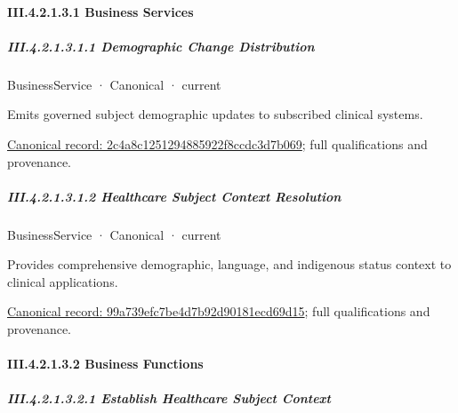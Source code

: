 \paragraph*{III.4.2.1.3.1 Business Services}
\label{navigation:III.4.2.1.3.1}

\subparagraph*{III.4.2.1.3.1.1 Demographic Change Distribution}
\label{navigation:III.4.2.1.3.1.1}

\label{element:2c4a8c1251294885922f8ccdc3d7b069}
{\small BusinessService · Canonical · current}\par

Emits governed subject demographic updates to subscribed clinical systems.


{\footnotesize \href{../../../../continuum/business/business-service/2c4a8c1251294885922f8ccdc3d7b069.md}{Canonical record: 2c4a8c1251294885922f8ccdc3d7b069}; full qualifications and provenance.}\par
\subparagraph*{III.4.2.1.3.1.2 Healthcare Subject Context Resolution}
\label{navigation:III.4.2.1.3.1.2}

\label{element:99a739efc7be4d7b92d90181ecd69d15}
{\small BusinessService · Canonical · current}\par

Provides comprehensive demographic, language, and indigenous status context to clinical applications.


{\footnotesize \href{../../../../continuum/business/business-service/99a739efc7be4d7b92d90181ecd69d15.md}{Canonical record: 99a739efc7be4d7b92d90181ecd69d15}; full qualifications and provenance.}\par
\paragraph*{III.4.2.1.3.2 Business Functions}
\label{navigation:III.4.2.1.3.2}

\subparagraph*{III.4.2.1.3.2.1 Establish Healthcare Subject Context}
\label{navigation:III.4.2.1.3.2.1}

